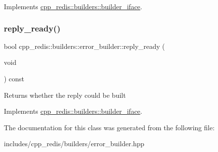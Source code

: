 Implements \mbox{\hyperlink{classcpp__redis_1_1builders_1_1builder__iface_a9892bbc9c887c31c2742dad4476e2fa6}{cpp\+\_\+redis\+::builders\+::builder\+\_\+iface}}.

\mbox{\label{classcpp__redis_1_1builders_1_1error__builder_af3d67647f012d0a7378684e2f8258a6d}} 
\subsubsection{\texorpdfstring{reply\+\_\+ready()}{reply\_ready()}}
{\footnotesize\ttfamily bool cpp\+\_\+redis\+::builders\+::error\+\_\+builder\+::reply\+\_\+ready (\begin{DoxyParamCaption}\item[{void}]{ }\end{DoxyParamCaption}) const\hspace{0.3cm}{\ttfamily [virtual]}}

\begin{DoxyReturn}{Returns}
whether the reply could be built 
\end{DoxyReturn}


Implements \mbox{\hyperlink{classcpp__redis_1_1builders_1_1builder__iface_a40db9a31d4ea1771777e74146d31e12d}{cpp\+\_\+redis\+::builders\+::builder\+\_\+iface}}.



The documentation for this class was generated from the following file\+:\begin{DoxyCompactItemize}
\item 
includes/cpp\+\_\+redis/builders/error\+\_\+builder.\+hpp\end{DoxyCompactItemize}
